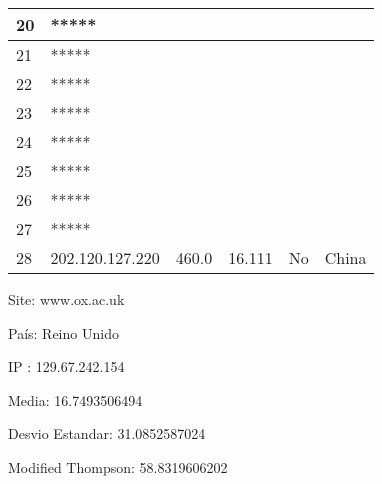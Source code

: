\begin{center}
\begin{tabular}{| l | l | l | l | l | l | }
   20      & *****          &        &        &         &                \\ \hline
   21      & *****          &        &        &         &                \\ \hline
   22      & *****          &        &        &         &                \\ \hline
   23      & *****          &        &        &         &                \\ \hline
   24      & *****          &        &        &         &                \\ \hline
   25      & *****          &        &        &         &                \\ \hline
   26      & *****          &        &        &         &                \\ \hline
   27      & *****          &        &        &         &                \\ \hline
   28      & 202.120.127.220 & 460.0 & 16.111 & No      & China          \\ \hline
    \end{tabular}
\end{center}

Site: www.ox.ac.uk

País: Reino Unido

IP : 129.67.242.154

Media: 16.7493506494 

Desvio Estandar: 31.0852587024 

Modified Thompson: 58.8319606202

